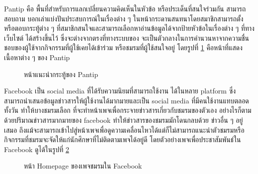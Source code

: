 \documentclass[14pt,oneside,openright,a4paper]{cpe-thai-project}
\begin{document}
Pantip คือ พื้นที่สำหรับการแลกเปลี่ยนความคิดเห็นในหัวข้อ หรือประเด็นที่สนใจร่วมกัน สามารถสอบถาม บอกเล่าแบ่งปันประสบการณ์ในเรื่องต่าง ๆ ในหน้ากระดานสนทนาโดยสมาชิกสามารถตั้ง หรือตอบกระทู้ต่าง ๆ ที่สมาชิกสนใจและสามารถเลือกหาอ่านข้อมูลได้จากป้ายหัวข้อในเรื่องต่าง ๆ ที่ทางเว็บไซต์ ได้สร้างขึ้นไว้ ซึ่งจะต่างจากตรงที่ทางระบบของ จะเป็นตัวกลางในการคำนวนหาจากความชื่นชอบของผู้ใช้จากกิจกรรมที่ผู้ใช้เคยได้เข้าร่วม หรือชมรมที่ผู้ใช้สนใจอยู่ โดยรูปที่ \ref{fig:pantip} คือหน้าที่แสดงเนื้อหาต่าง ๆ ของ Pantip

  \begin{figure}[!h]\centering
    \setlength{\fboxrule}{0.5mm} %
    \setlength{\fboxsep}{0.5cm}
    \caption{หน้าแนะนำกระทู้ของ Pantip}\label{fig:pantip}
    \end{figure}

Facebook เป็น social media ที่ได้รับความนิยมที่สามารถใช้งาน ได้ในหลาย platform ซึ่งสามารถนำเสนอข้อมูลข่าวสารให้ผู้ใช้งานได้มากมายและเป็น social media ที่มีคนใช้งานแทบตลอดทั้งวัน ทำให้บางชมรมเลือก
ที่จะทำหน้าเพจเพื่อกระจายข่าวสารเกี่ยวกับชมรมของตัวเอง อย่างไรก็ตามด้วยปริมาณข่าวสารมากมายของ facebook ทำให้ข่าวสารของชมรมมักโดนกลบด้วย  ข่าวอื่น ๆ อยู่เสมอ ถึงแม้จะสามารถเข้าไปสู่หน้าเพจเพื่อดูความเคลื่อนไหวได้แต่ก็ไม่สามารถแนะนำตัวชมรมหรือกิจกรรมที่ชมรมจะจัดให้แก่นักศึกษาที่ไม่ติดตามเพจได้อยู่ดี โดยตัวอย่างเพจเพื่อประชาสัมพันธ์ใน Facebook ดูได้ในรูปที่ \ref{fig:facebook}

  \begin{figure}[!h]\centering
    \setlength{\fboxrule}{0.5mm} %
    \setlength{\fboxsep}{0.5cm}
    \caption{หน้า Homepage ของเพจชมรมใน Facebook}\label{fig:facebook}
    \end{figure}
\end{document}
